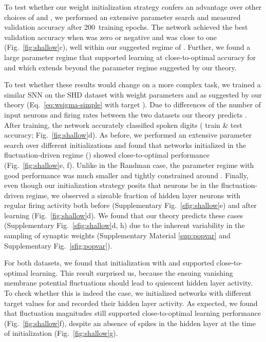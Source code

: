 \documentclass[11pt,a4paper]{article}
\begin{document}
To test whether our weight initialization strategy confers an advantage over
other choices of  and , we performed an extensive parameter
search and measured validation accuracy after 200~training epochs.
The network achieved the best validation accuracy when  was zero or
negative and  was close to one (Fig.~\ref{fig:shallow}c), well within
our suggested regime of .
Further, we found a large parameter regime that supported learning at 
close-to-optimal accuracy for  and  
which extends beyond the parameter regime suggested by our theory.

To test whether these results would change on a more complex task, we trained a
similar \ac{SNN} on the \ac{SHD} dataset \cite{cramer_heidelberg_2020} with weight
parameters  and  as suggested by
our theory (Eq.~\eqref{eq:wsigma-simple} with target ).
Due to differences of the number of input neurons and firing rates between the
two datasets our theory predicts .
After training, the network accurately classified spoken digits ( train \&  test accuracy; Fig.~\ref{fig:shallow}d).
As before, we performed an extensive parameter search over different
initializations and found that networks initialized in the fluctuation-driven
regime () showed close-to-optimal performance
(Fig.~\ref{fig:shallow}e, f).
Unlike in the Randman case, the parameter regime with good performance was much
smaller and tightly constrained around .
Finally, even though our initialization strategy posits that neurons be in the
fluctuation-driven regime, we observed a sizeable fraction of hidden layer
neurons with regular firing activity both before (Supplementary Fig.~\ref{sfig:shallow}e) and after learning (Fig.~\ref{fig:shallow}d). 
We found that our theory predicts these cases (Supplementary Fig.~\ref{sfig:shallow}d, h) due to the inherent variability in the sampling of
synaptic weights (Supplementary Material \ref{sup:popvar} and Supplementary Fig.~\ref{sfig:popvar}).

For both datasets, we found that initialization with  and
 supported close-to-optimal learning.
This result surprised us, because the ensuing vanishing membrane potential
fluctuations should lead to quiescent hidden layer activity.
To check whether this is indeed the case, we initialized networks with
different target values for  and recorded their hidden layer
activity.
As expected, we found that fluctuation magnitudes  still
supported close-to-optimal learning performance (Fig.~\ref{fig:shallow}f),
despite an absence of spikes in the hidden layer at the time of initialization
(Fig.~\ref{fig:shallow}g).
\end{document}
